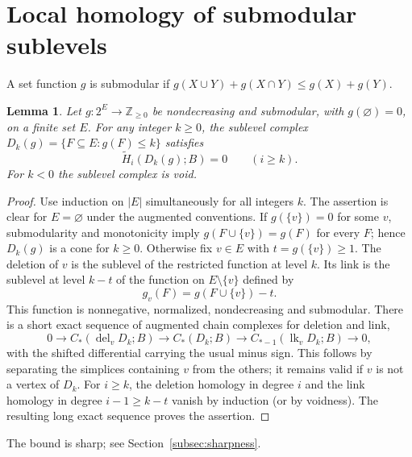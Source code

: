 \documentclass[11pt,a4paper]{article}
\newtheorem{lemma}[theorem]{Lemma}
\theoremstyle{definition}
\newcommand{\lk}{\operatorname{lk}}
\newcommand{\del}{\operatorname{del}}
\newcommand{\Ht}{\widetilde H}
\newcommand{\NN}{\mathbb Z_{\geq 0}}
\begin{document}
\section{Local homology of submodular sublevels}\label{sec:submodular}
A set function $g$ is submodular if $g(X\cup Y)+g(X\cap Y)\leq g(X)+g(Y)$.
\begin{lemma}\label{lem:submod}
Let $g:2^E\longrightarrow\NN$ be nondecreasing and submodular, with $g(\varnothing)=0$, on a finite set $E$. For any integer $k\geq0$, the sublevel complex $D_k(g)=\{F\subseteq E:g(F)\leq k\}$ satisfies
\[
 \Ht_i(D_k(g);B)=0\qquad(i\geq k).
\]
For $k<0$ the sublevel complex is void.
\end{lemma}
\begin{proof}
Use induction on $|E|$ simultaneously for all integers $k$. The assertion is clear for $E=\varnothing$ under the augmented conventions. If $g(\{v\})=0$ for some $v$, submodularity and monotonicity imply $g(F\cup\{v\})=g(F)$ for every $F$; hence $D_k(g)$ is a cone for $k\geq0$. Otherwise fix $v\in E$ with $t=g(\{v\})\geq1$. The deletion of $v$ is the sublevel of the restricted function at level $k$. Its link is the sublevel at level $k-t$ of the function on $E\setminus\{v\}$ defined by
\[
 g_v(F)=g(F\cup\{v\})-t.
\]
This function is nonnegative, normalized, nondecreasing and submodular. There is a short exact sequence of augmented chain complexes for deletion and link,
\[
 0\to C_*(\del_vD_k;B)\to C_*(D_k;B)
 \to C_{*-1}(\lk_vD_k;B)\to0,
\]
with the shifted differential carrying the usual minus sign. This follows by separating the simplices containing $v$ from the others; it remains valid if $v$ is not a vertex of $D_k$. For $i\geq k$, the deletion homology in degree $i$ and the link homology in degree $i-1\geq k-t$ vanish by induction (or by voidness). The resulting long exact sequence proves the assertion.
\end{proof}
The bound is sharp; see Section~\ref{subsec:sharpness}.
\end{document}
